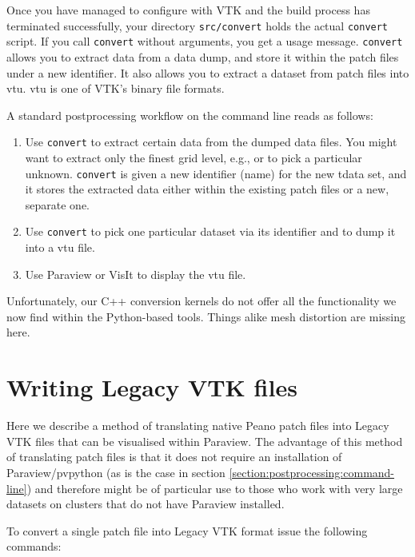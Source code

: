 \noindent
Once you have managed to configure with VTK and the build process has terminated
successfully, your directory \texttt{src/convert} holds the actual \texttt{convert}
script.
If you call \texttt{convert} without arguments, you get a usage message.
\texttt{convert} allows you to extract data from a data dump, and store it
within the patch files under a new identifier.
It also allows you to extract a dataset from patch files into vtu.
vtu is one of VTK's binary file formats.


A standard postprocessing workflow on the command line reads as follows:
\begin{enumerate}
  \item Use \texttt{convert} to extract certain data from the dumped data files.
  You might want to extract only the finest grid level, e.g., or to pick a
  particular unknown. \texttt{convert} is given a new identifier (name) for the
  new tdata set, and it stores the extracted data either within the existing
  patch files or a new, separate one.
  \item Use \texttt{convert} to pick one particular dataset via its identifier
  and to dump it into a vtu file.
  \item Use Paraview or VisIt to display the vtu file.
\end{enumerate}

\begin{remark}
 Unfortunately, our C++ conversion kernels do not offer all the functionality we
 now find within the Python-based tools. Things alike mesh distortion are
 missing here.
\end{remark}

\section{Writing Legacy VTK files}
\label{section:postprocessing:legacy-vtk}

Here we describe a method of translating native Peano patch files into Legacy VTK files that can be visualised within Paraview. The advantage of this method of translating patch files is that it does not require an installation of Paraview/pvpython (as is the case in section \ref{section:postprocessing:command-line}) and therefore might be of particular use to those who work with very large datasets on clusters that do not have Paraview installed.

To convert a single patch file into Legacy VTK format issue the following commands:

